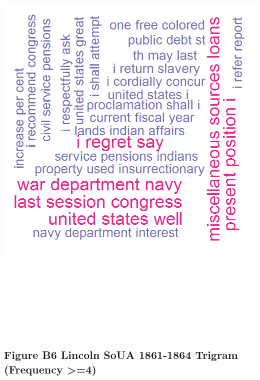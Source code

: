 \documentclass[]{article}
\begin{document}
\includegraphics[height=8.33333in]{images/Lincolndata_trigram_wc.png}

\vfill

\subsection{Figure B6 Lincoln SoUA 1861-1864 Trigram (Frequency
\textgreater{}=4)}\label{figure-b6-lincoln-soua-1861-1864-trigram-frequency-4}
\end{document}
